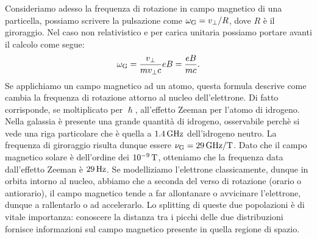 Consideriamo adesso la frequenza di rotazione in campo magnetico di una particella, possiamo scrivere la pulsazione come $\omega_\textup{G} = v_\bot / R$, dove $R$ è il giroraggio. Nel caso non relativistico e per carica unitaria possiamo portare avanti il calcolo come segue:
\begin{equation}
    \omega_\textup{G} = \frac{v_\bot}{mv_\bot c}eB = \frac{eB}{mc}. \label{eq:omegagiro}
\end{equation}
Se applichiamo un campo magnetico ad un atomo, questa formula descrive come cambia la frequenza di rotazione attorno al nucleo dell'elettrone. Di fatto corrisponde, se moltiplicato per $\hslash$, all'effetto Zeeman per l'atomo di idrogeno. Nella galassia è presente una grande quantità di idrogeno, osservabile perchè si vede una riga particolare che è quella a $1.4\,\textup{GHz}$ dell'idrogeno neutro. La frequenza di giroraggio risulta dunque essere $\nu_\textup{G} = 29\,\textup{GHz}/\textup{T}$. Dato che il campo magnetico solare è dell'ordine dei $10^{-9}\,\textup{T}$, otteniamo che la frequenza data dall'effetto Zeeman è $29\,\textup{Hz}$. Se modelliziamo l'elettrone classicamente, dunque in orbita intorno al nucleo, abbiamo che a seconda del verso di rotazione (orario o antiorario), il campo magnetico tende a far allontanare o avvicinare l'elettrone, dunque a rallentarlo o ad accelerarlo. Lo splitting di queste due popolazioni è di vitale importanza: conoscere la distanza tra i picchi delle due distribuzioni fornisce informazioni sul campo magnetico presente in quella regione di spazio.

